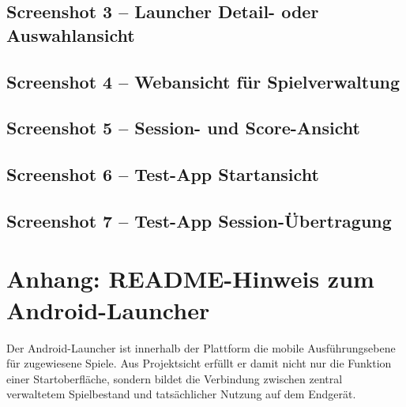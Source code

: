 \documentclass[12pt,a4paper]{article}
\begin{document}
\subsection*{Screenshot 3 -- Launcher Detail- oder Auswahlansicht}

\subsection*{Screenshot 4 -- Webansicht für Spielverwaltung}

\subsection*{Screenshot 5 -- Session- und Score-Ansicht}

\subsection*{Screenshot 6 -- Test-App Startansicht}

\subsection*{Screenshot 7 -- Test-App Session-Übertragung}

\newpage
\appendix
\section{Anhang: README-Hinweis zum Android-Launcher}
Der Android-Launcher ist innerhalb der Plattform die mobile Ausführungsebene für zugewiesene Spiele. Aus Projektsicht erfüllt er damit nicht nur die Funktion einer Startoberfläche, sondern bildet die Verbindung zwischen zentral verwaltetem Spielbestand und tatsächlicher Nutzung auf dem Endgerät.
\end{document}
